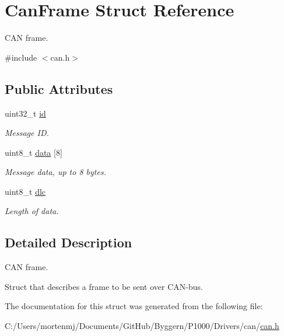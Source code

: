\hypertarget{struct_can_frame}{\section{Can\-Frame Struct Reference}
\label{struct_can_frame}
}


C\-A\-N frame.  




{\ttfamily \#include $<$can.\-h$>$}

\subsection*{Public Attributes}
\begin{DoxyCompactItemize}
\item 
\hypertarget{struct_can_frame_aa850629d26a09531d2f40bd2b30b77f7}{uint32\-\_\-t \hyperlink{struct_can_frame_aa850629d26a09531d2f40bd2b30b77f7}{id}}\label{struct_can_frame_aa850629d26a09531d2f40bd2b30b77f7}

\begin{DoxyCompactList}\small\item\em Message I\-D. \end{DoxyCompactList}\item 
\hypertarget{struct_can_frame_adb669739b80159e1014ea86419fe8852}{uint8\-\_\-t \hyperlink{struct_can_frame_adb669739b80159e1014ea86419fe8852}{data} \mbox{[}8\mbox{]}}\label{struct_can_frame_adb669739b80159e1014ea86419fe8852}

\begin{DoxyCompactList}\small\item\em Message data, up to 8 bytes. \end{DoxyCompactList}\item 
\hypertarget{struct_can_frame_aa896aaac27a424ba8e46c50e7bdb065d}{uint8\-\_\-t \hyperlink{struct_can_frame_aa896aaac27a424ba8e46c50e7bdb065d}{dlc}}\label{struct_can_frame_aa896aaac27a424ba8e46c50e7bdb065d}

\begin{DoxyCompactList}\small\item\em Length of data. \end{DoxyCompactList}\end{DoxyCompactItemize}


\subsection{Detailed Description}
C\-A\-N frame. 

Struct that describes a frame to be sent over C\-A\-N-\/bus. 

The documentation for this struct was generated from the following file\-:\begin{DoxyCompactItemize}
\item 
C\-:/\-Users/mortenmj/\-Documents/\-Git\-Hub/\-Byggern/\-P1000/\-Drivers/can/\hyperlink{can_8h}{can.\-h}\end{DoxyCompactItemize}
